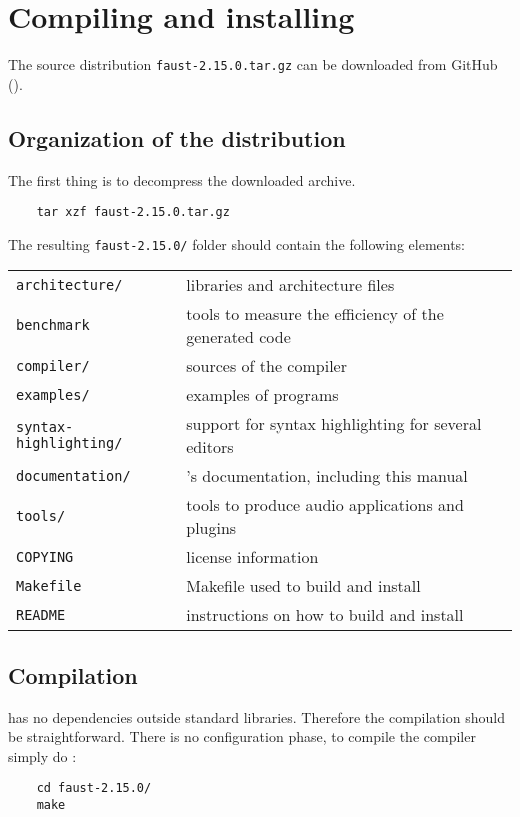 \chapter{Compiling and installing \faust}

The \faust source distribution \lstinline'faust-2.15.0.tar.gz' can be downloaded from GitHub ().

\section{Organization of the distribution}
The first thing is to decompress the downloaded archive. 
\begin{lstlisting}
	tar xzf faust-2.15.0.tar.gz
\end{lstlisting}

The resulting  \lstinline'faust-2.15.0/' folder should contain the following elements:

\begin{tabular}{ll}
	\lstinline'architecture/' 		&\faust libraries and architecture files\\
	\lstinline'benchmark'			&tools to measure the efficiency of the generated code\\
	\lstinline'compiler/'			&sources of the \faust compiler\\
	\lstinline'examples/'			&examples of \faust programs\\
	\lstinline'syntax-highlighting/'&	support for syntax highlighting for several editors\\
	\lstinline'documentation/' 		&\faust's documentation, including this manual\\
	\lstinline'tools/'				&tools to produce audio applications and plugins\\
	\lstinline'COPYING'			&license information\\
	\lstinline'Makefile'			&Makefile used to build and install \faust\\
	\lstinline'README'			&instructions on how to build and install \faust
\end{tabular}

\section{Compilation}
\faust has no dependencies outside standard libraries. Therefore the compilation should be straightforward. There is no configuration phase, to compile the \faust compiler simply do :
\begin{lstlisting}
	cd faust-2.15.0/
	make
\end{lstlisting}


